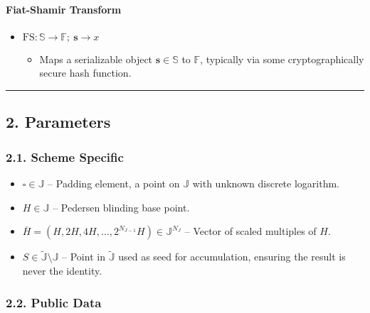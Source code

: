 \documentclass[
]{article}
\providecommand{\tightlist}{%
  \setlength{\itemsep}{0pt}\setlength{\parskip}{0pt}}
\begin{document}
\hypertarget{fiat-shamir-transform}{%
\paragraph{Fiat-Shamir Transform}\label{fiat-shamir-transform}}

\begin{itemize}
\tightlist
\item
  \(\text{FS}: \mathbb{S} \rightarrow \mathbb{F};\ \textbf{s} \rightarrow x\)

  \begin{itemize}
  \tightlist
  \item
    Maps a serializable object \(\textbf{s} \in \mathbb{S}\) to
    \(\mathbb{F}\), typically via some cryptographically secure hash
    function.
  \end{itemize}
\end{itemize}

\begin{center}\rule{0.5\linewidth}{0.5pt}\end{center}

\hypertarget{parameters}{%
\subsection{2. Parameters}\label{parameters}}

\hypertarget{scheme-specific}{%
\subsubsection{2.1. Scheme Specific}\label{scheme-specific}}

\begin{itemize}
\tightlist
\item
  \(\square \in \mathbb{J}\) -- Padding element, a point on
  \(\mathbb{J}\) with unknown discrete logarithm.
\item
  \(H \in \mathbb{J}\) -- Pedersen blinding base point.
\item
  \(\overline{H} = (H, 2H, 4H, \ldots, 2^{N_{J-1}}H) \in \mathbb{J}^{N_J}\)
  -- Vector of scaled multiples of \(H\).
\item
  \(S \in \tilde{\mathbb{J}} \setminus \mathbb{J}\) -- Point in
  \(\tilde{\mathbb{J}}\) used as seed for accumulation, ensuring the
  result is never the identity.
\end{itemize}

\hypertarget{public-data}{%
\subsubsection{2.2. Public Data}\label{public-data}}
\end{document}
